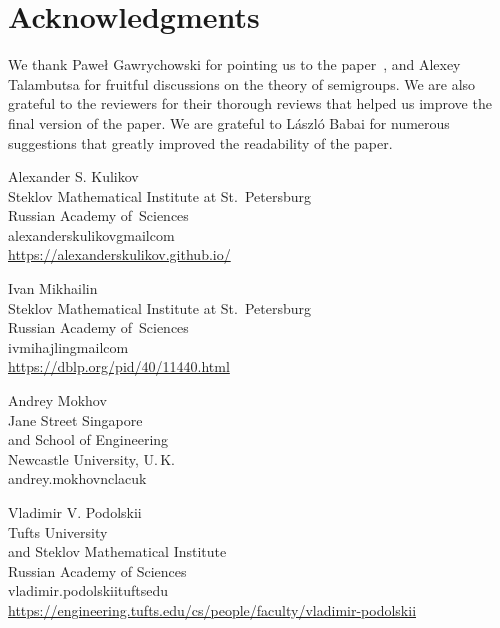 \documentclass{toc}
\begin{document}
%
%
%
%
%
%
%
%
%
%
%
%
%
%
%
%
%
%
%
%
%
%
%
%
%
%
%
%
%
%
%
%
%
%
%
%
%
%
%
%
%
%
%
%
%
%
%
%
%
%
%
%
%
%
%
%
%
%
%
%
%
%
%
%
%
%
%
%
%
%
%
%
%
%
%
%
%
%
%
%
%
%
%
%
%
%
%
%
%
%
%
%
%
%
%
%
%


\section*{Acknowledgments}
We thank
%
%
Pawe\l{} Gawrychowski
for pointing us to the
paper~\cite{DBLP:journals/ijcga/ChazelleR91}, and Alexey Talambutsa for
fruitful discussions on the theory of semigroups.
We are also grateful to the reviewers for their thorough reviews that helped us
improve the final version of the paper.
We are grateful to László Babai for numerous suggestions that greatly improved the
readability of the paper.


%
%


%
%
%
%
%
%
%
%
%
%
%
%
%
%
%

\begin{tocauthors}
\begin{tocinfo}[kulikov]
    Alexander S. Kulikov\\
    Steklov Mathematical Institute at St.~Petersburg \\ %
    Russian Academy of~Sciences\\
    alexander\tocdot{}s\tocdot{}kulikov\tocat{}gmail\tocdot{}com\\
    \url{https://alexanderskulikov.github.io/}
\end{tocinfo}
%
\begin{tocinfo}[mikhailin]
    Ivan Mikhailin\\
    Steklov Mathematical Institute at St.~Petersburg\\
    Russian Academy of~Sciences\\  %
    ivmihajlin\tocat{}gmail\tocdot{}com\\
    \url{https://dblp.org/pid/40/11440.html}
\end{tocinfo}
\begin{tocinfo}[mokhov]
    Andrey Mokhov\\
    Jane Street Singapore\\
    and School of Engineering \\  %
    Newcastle University, U.\,K.\\ %
    andrey.mokhov\tocat{}ncl\tocdot{}ac\tocdot{}uk
\end{tocinfo}
\begin{tocinfo}[podolskii]
    Vladimir V. Podolskii\\
    Tufts University\\
    and Steklov Mathematical Institute \\
    Russian Academy of Sciences\\
    vladimir.podolskii\tocat{}tufts\tocdot{}edu\\
    \url{https://engineering.tufts.edu/cs/people/faculty/vladimir-podolskii}
\end{tocinfo}
\end{tocauthors}
\end{document}

